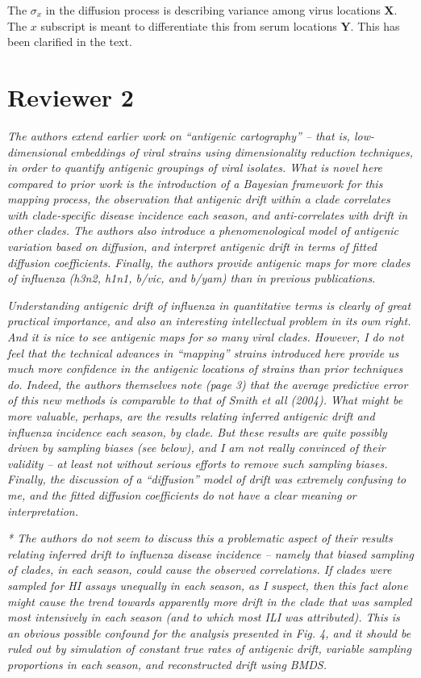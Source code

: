 \documentclass[11pt,oneside,letterpaper]{article}
\begin{document}
The $\sigma_x$ in the diffusion process is describing variance among virus locations $\mathbf{X}$.  The $x$ subscript is meant to differentiate this from serum locations $\mathbf{Y}$.  This has been clarified in the text.

\section*{Reviewer 2}

\textsl{The authors extend earlier work on ``antigenic cartography'' -- that is, low-dimensional embeddings of viral strains using dimensionality reduction techniques, in order to quantify antigenic groupings of viral isolates. What is novel here compared to prior work is the introduction of a Bayesian framework for this mapping process, the observation that antigenic drift within a clade correlates with clade-specific disease incidence each season, and anti-correlates with drift in other clades. The authors also introduce a phenomenological model of antigenic variation based on diffusion, and interpret antigenic drift in terms of fitted diffusion coefficients. Finally, the authors provide antigenic maps for more clades of influenza (h3n2, h1n1, b/vic, and b/yam) than in previous publications.}

\textsl{Understanding antigenic drift of influenza in quantitative terms is clearly of great practical importance, and also an interesting intellectual problem in its own right. And it is nice to see antigenic maps for so many viral clades. However, I do not feel that the technical advances in ``mapping'' strains introduced here provide us much more confidence in the antigenic locations of strains than prior techniques do. Indeed, the authors themselves note (page 3) that the average predictive error of this new methods is comparable to that of Smith et all (2004). What might be more valuable, perhaps, are the results relating inferred antigenic drift and influenza incidence each season, by clade. But these results are quite possibly driven by sampling biases (see below), and I am not really convinced of their validity -- at least not without serious efforts to remove such sampling biases. Finally, the discussion of a ``diffusion'' model of drift was extremely confusing to me, and the fitted diffusion coefficients do not have a clear meaning or interpretation.}

\textsl{* The authors do not seem to discuss this a problematic aspect of their results relating inferred drift to influenza disease incidence -- namely that biased sampling of clades, in each season, could cause the observed correlations. If clades were sampled for HI assays unequally in each season, as I suspect, then this fact alone might cause the trend towards apparently more drift in the clade that was sampled most intensively in each season (and to which most ILI was attributed). This is an obvious possible confound for the analysis presented in Fig. 4, and it should be ruled out by simulation of constant true rates of antigenic drift, variable sampling proportions in each season, and reconstructed drift using BMDS.}
\end{document}
